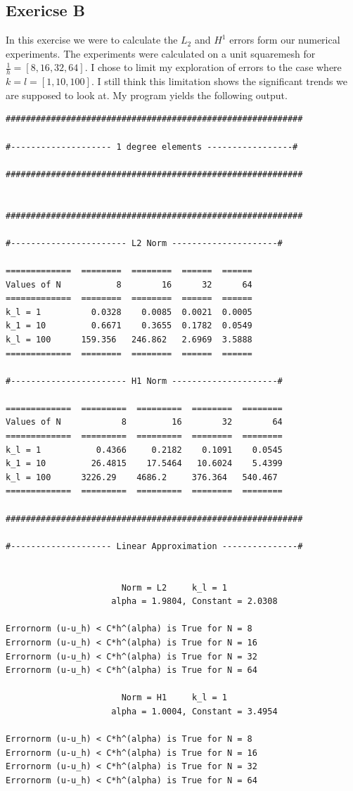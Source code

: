 \documentclass[a4paper,norsk]{article}
\begin{document}
\subsection*{Exericse B}
In this exercise we were to calculate the $L_2$ and $H^1$ errors form our numerical experiments.
The experiments were calculated on a unit squaremesh for $\frac{1}{h} = [8, 16, 32, 64]$.
I chose to limit my exploration of errors to the case
where $k = l = [1, 10, 100]$. I still think this limitation shows the significant trends
we are supposed to look at. My program yields the following output.

\newpage
\begin{lstlisting}[style=terminal]
###########################################################

#-------------------- 1 degree elements -----------------#

###########################################################


###########################################################

#----------------------- L2 Norm ---------------------#

=============  ========  ========  ======  ======
Values of N           8        16      32      64
=============  ========  ========  ======  ======
k_l = 1          0.0328    0.0085  0.0021  0.0005
k_1 = 10         0.6671    0.3655  0.1782  0.0549
k_l = 100      159.356   246.862   2.6969  3.5888
=============  ========  ========  ======  ======

#----------------------- H1 Norm ---------------------#

=============  =========  =========  ========  ========
Values of N            8         16        32        64
=============  =========  =========  ========  ========
k_l = 1           0.4366     0.2182    0.1091    0.0545
k_1 = 10         26.4815    17.5464   10.6024    5.4399
k_l = 100      3226.29    4686.2     376.364   540.467
=============  =========  =========  ========  ========

###########################################################

#-------------------- Linear Approximation ---------------#


                       Norm = L2     k_l = 1
                     alpha = 1.9804, Constant = 2.0308

Errornorm (u-u_h) < C*h^(alpha) is True for N = 8
Errornorm (u-u_h) < C*h^(alpha) is True for N = 16
Errornorm (u-u_h) < C*h^(alpha) is True for N = 32
Errornorm (u-u_h) < C*h^(alpha) is True for N = 64

                       Norm = H1     k_l = 1
                     alpha = 1.0004, Constant = 3.4954

Errornorm (u-u_h) < C*h^(alpha) is True for N = 8
Errornorm (u-u_h) < C*h^(alpha) is True for N = 16
Errornorm (u-u_h) < C*h^(alpha) is True for N = 32
Errornorm (u-u_h) < C*h^(alpha) is True for N = 64
\end{lstlisting}
\end{document}
